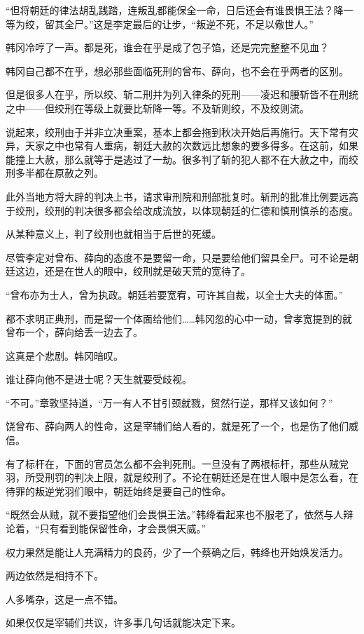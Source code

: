 “但将朝廷的律法胡乱践踏，连叛乱都能保全一命，日后还会有谁畏惧王法？降一等为绞，留其全尸。”这是李定最后的让步，“叛逆不死，不足以儆世人。”

韩冈冷哼了一声。都是死，谁会在乎是成了包子馅，还是完完整整不见血？

韩冈自己都不在乎，想必那些面临死刑的曾布、薛向，也不会在乎两者的区别。

但是很多人在乎，所以绞、斩二刑并为列入律条的死刑——凌迟和腰斩皆不在刑统之中——但绞刑在等级上就要比斩降一等。不及斩则绞，不及绞则流。

说起来，绞刑由于并非立决重案，基本上都会拖到秋决开始后再施行。天下常有灾异，天家之中也常有人重病，朝廷大赦的次数远比想象的要多得多。在这前，如果能撞上大赦，那么就等于是逃过了一劫。很多判了斩的犯人都不在大赦之中，而绞刑多半都在原赦之列。

此外当地方将大辟的判决上书，请求审刑院和刑部批复时。斩刑的批准比例要远高于绞刑，绞刑的判决很多都会给改成流放，以体现朝廷的仁德和慎刑慎杀的态度。

从某种意义上，判了绞刑也就相当于后世的死缓。

尽管李定对曾布、薛向的态度不是要留一命，只是要给他们留具全尸。可不论是朝廷这边，还是在世人的眼中，绞刑就是破天荒的宽待了。

“曾布亦为士人，曾为执政。朝廷若要宽宥，可许其自裁，以全士大夫的体面。”

都不求明正典刑，而是留一个体面给他们……韩冈忽的心中一动，曾孝宽提到的就曾布一个，薛向给丢一边去了。

这真是个悲剧。韩冈暗叹。

谁让薛向他不是进士呢？天生就要受歧视。

“不可。”章敦坚持道，“万一有人不甘引颈就戮，贸然行逆，那样又该如何？”

饶曾布、薛向两人的性命，这是宰辅们给人看的，就是死了一个，也是伤了他们威信。

有了标杆在，下面的官员怎么都不会判死刑。一旦没有了两根标杆，那些从贼党羽，所受刑罚的判决上限，就是绞刑了。不论在朝廷还是在世人眼中是怎么看，在待罪的叛逆党羽们眼中，朝廷始终是要自己的性命。

“既然会从贼，就不要指望他们会畏惧王法。”韩绛看起来也不服老了，依然与人辩论着，“只有看到能保留性命，才会畏惧天威。”

权力果然是能让人充满精力的良药，少了一个蔡确之后，韩绛也开始焕发活力。

两边依然是相持不下。

人多嘴杂，这是一点不错。

如果仅仅是宰辅们共议，许多事几句话就能决定下来。

